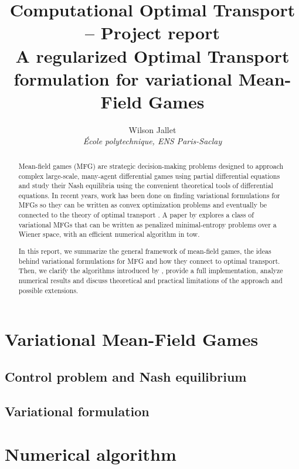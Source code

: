\documentclass[11pt]{article}
\author{
	Wilson Jallet\\
	\textit{École polytechnique, ENS Paris-Saclay}
}
\title{
	{\Large\sffamily Computational Optimal Transport -- Project report}\\
	{\Large A regularized Optimal Transport formulation for variational Mean-Field Games}}
\numberwithin{equation}{section}
\theoremstyle{definition}
\begin{document}
\maketitle


\begin{abstract}
	Mean-field games (MFG) are strategic decision-making problems designed to approach complex large-scale, many-agent differential games using partial differential equations and study their Nash equilibria using the convenient theoretical tools of differential equations. In recent years, work has been done on finding variational formulations for MFGs so they can be written as convex optimization problems and eventually be connected to the theory of optimal transport \cite{benamou:hal-01295299,benamou2015lagrangian}.
	A paper by \textcite{benamou2018entropy} explores a class of variational MFGs that can be written as penalized minimal-entropy problems over a Wiener space, with an efficient numerical algorithm in tow.
	
	In this report, we summarize the general framework of mean-field games, the ideas behind variational formulations for MFG and how they connect to optimal transport. Then, we clarify the algorithms introduced by \cite{benamou2018entropy}, provide a full implementation, analyze numerical results and discuss theoretical and practical limitations of the approach and possible extensions.
\end{abstract}



\section{Variational Mean-Field Games}

\subsection{Control problem and Nash equilibrium}



\subsection{Variational formulation}




\section{Numerical algorithm}
\end{document}
